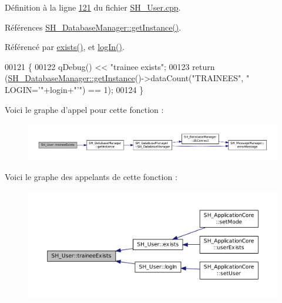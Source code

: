 Définition à la ligne \hyperlink{SH__User_8cpp_source_l00121}{121} du fichier \hyperlink{SH__User_8cpp_source}{S\-H\-\_\-\-User.\-cpp}.



Références \hyperlink{classSH__DatabaseManager_a638369a15265ab0aa053080a32d2ca39}{S\-H\-\_\-\-Database\-Manager\-::get\-Instance()}.



Référencé par \hyperlink{classSH__User_aa83a99478cf6c738f995c5c36345bcd3}{exists()}, et \hyperlink{classSH__User_ad83af309786cb1ed5dbbd2cdca195c30}{log\-In()}.


\begin{DoxyCode}
00121                                          \{
00122     qDebug() << \textcolor{stringliteral}{"trainee exists"};
00123     \textcolor{keywordflow}{return} (\hyperlink{classSH__DatabaseManager_a638369a15265ab0aa053080a32d2ca39}{SH\_DatabaseManager::getInstance}()->dataCount(\textcolor{stringliteral}{"TRAINEES"}, \textcolor{stringliteral}{"
      LOGIN='"}+login+\textcolor{stringliteral}{"'"}) == 1);
00124 \}
\end{DoxyCode}


Voici le graphe d'appel pour cette fonction \-:
\nopagebreak
\begin{figure}[H]
\begin{center}
\leavevmode
\includegraphics[width=350pt]{classSH__User_af40edc91cf1a4d8065fb43d2899c3dcb_cgraph}
\end{center}
\end{figure}




Voici le graphe des appelants de cette fonction \-:
\nopagebreak
\begin{figure}[H]
\begin{center}
\leavevmode
\includegraphics[width=350pt]{classSH__User_af40edc91cf1a4d8065fb43d2899c3dcb_icgraph}
\end{center}
\end{figure}


